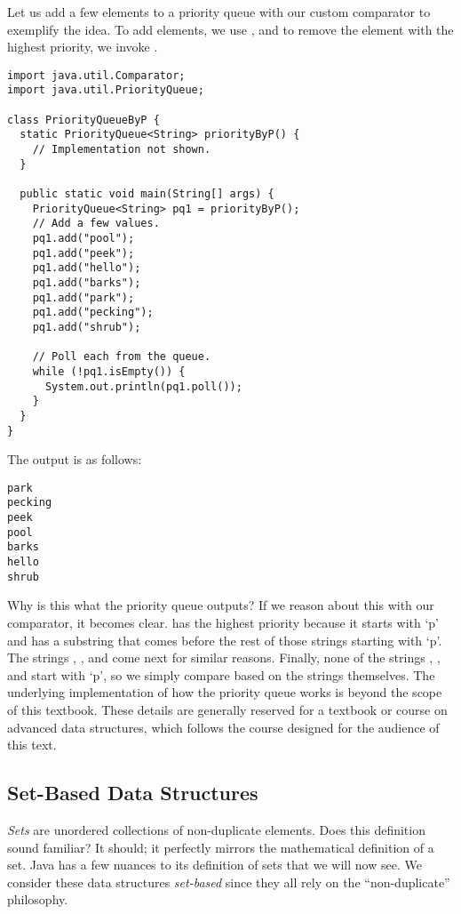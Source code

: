 Let us add a few elements to a priority queue with our custom comparator to exemplify the idea. To add elements, we use , and to remove the element with the highest priority, we invoke .

\begin{cl}[]{}
\begin{lstlisting}[language=MyJava]
import java.util.Comparator;
import java.util.PriorityQueue;

class PriorityQueueByP {
  static PriorityQueue<String> priorityByP() {
    // Implementation not shown.
  }

  public static void main(String[] args) {
    PriorityQueue<String> pq1 = priorityByP();
    // Add a few values.
    pq1.add("pool");
    pq1.add("peek");
    pq1.add("hello");
    pq1.add("barks");
    pq1.add("park");
    pq1.add("pecking");
    pq1.add("shrub");

    // Poll each from the queue.
    while (!pq1.isEmpty()) {
      System.out.println(pq1.poll());
    }
  }
}
\end{lstlisting}
\end{cl}
The output is as follows:
\begin{verbatim}
park
pecking
peek
pool
barks
hello
shrub
\end{verbatim}
Why is this what the priority queue outputs? If we reason about this with our comparator, it becomes clear.  has the highest priority because it starts with `p' and has a substring that comes before the rest of those strings starting with `p'. The strings , , and  come next for similar reasons. Finally, none of the strings , , and  start with `p', so we simply compare based on the strings themselves. The underlying implementation of how the priority queue works is beyond the scope of this textbook. These details are generally reserved for a textbook or course on advanced data structures, which follows the course designed for the audience of this text.

\subsection*{Set-Based Data Structures}
\textit{Sets} are unordered collections of non-duplicate elements. Does this definition sound familiar? It should; it perfectly mirrors the mathematical definition of a set. Java has a few nuances to its definition of sets that we will now see. We consider these data structures \textit{set-based} since they all rely on the ``non-duplicate'' philosophy.

